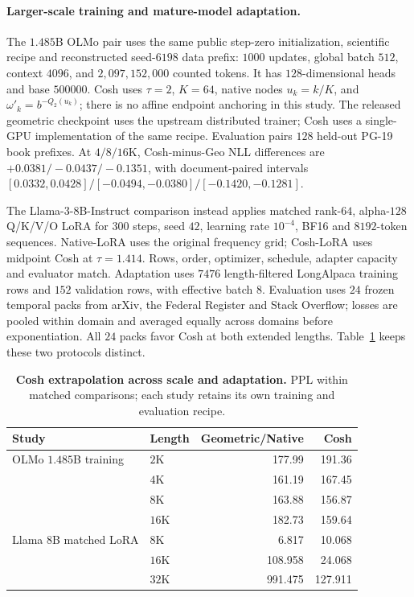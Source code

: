 \paragraph{Larger-scale training and mature-model adaptation.}
\label{sec:cosh-scale-adaptation}
The $1.485$B OLMo pair uses the same public step-zero initialization,
scientific recipe and reconstructed seed-$6198$ data prefix: $1000$ updates,
global batch $512$, context $4096$, and $2{,}097{,}152{,}000$ counted tokens.
It has $128$-dimensional heads and base $500000$. Cosh uses $\tau=2$,
$K=64$, native nodes $u_k=k/K$, and $\omega'_k=b^{-Q_2(u_k)}$;
there is no affine endpoint anchoring in this study. The released geometric
checkpoint uses the upstream distributed trainer; Cosh uses a single-GPU
implementation of the same recipe. Evaluation pairs $128$ held-out PG-19
book prefixes. At $4/8/16$K, Cosh-minus-Geo NLL differences are
$+0.0381/-0.0437/-0.1351$, with document-paired intervals
$[0.0332,0.0428]/[-0.0494,-0.0380]/[-0.1420,-0.1281]$.

The Llama-$3$-$8$B-Instruct comparison instead applies matched rank-$64$,
alpha-$128$ Q/K/V/O LoRA for $300$ steps, seed $42$, learning rate $10^{-4}$,
BF16 and $8192$-token sequences. Native-LoRA uses the original frequency grid;
Cosh-LoRA uses midpoint Cosh at $\tau=1.414$. Rows, order, optimizer, schedule,
adapter capacity and evaluator match. Adaptation uses $7476$ length-filtered
LongAlpaca training rows and $152$ validation rows, with effective batch $8$.
Evaluation uses $24$ frozen temporal
packs from arXiv, the Federal Register and Stack Overflow; losses are pooled
within domain and averaged equally across domains before exponentiation.
All $24$ packs favor Cosh at both extended lengths. Table~\ref{tab:cosh-mature-ppl}
keeps these two protocols distinct.
\begin{table}[ht]
\centering\small
\caption{\textbf{Cosh extrapolation across scale and adaptation.} PPL within
matched comparisons; each study retains its own training and evaluation recipe.}
\label{tab:cosh-mature-ppl}
\begin{tabular}{@{}llrr@{}}
\toprule
Study & Length & Geometric/Native & Cosh \\
\midrule
OLMo $1.485$B training & $2$K & 177.99 & 191.36 \\
 & $4$K & 161.19 & 167.45 \\
 & $8$K & 163.88 & 156.87 \\
 & $16$K & 182.73 & 159.64 \\
Llama $8$B matched LoRA & $8$K & 6.817 & 10.068 \\
 & $16$K & 108.958 & 24.068 \\
 & $32$K & 991.475 & 127.911 \\
\bottomrule
\end{tabular}
\end{table}

